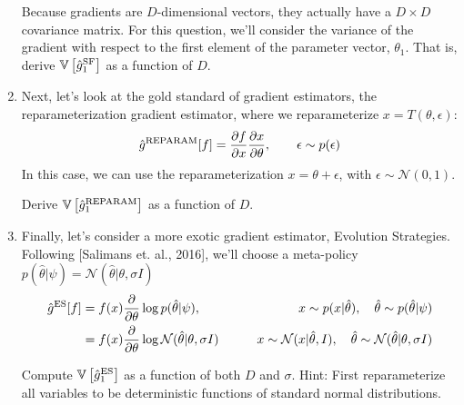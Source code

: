 \documentclass{harvardml}
\newcommand{\distNorm}{\mathcal{N}}
\newcommand{\var}{\mathbb{V}}
\newcommand{\PT}{\frac{\partial}{\partial \theta}}
\theoremstyle{plain}
\begin{document}
\begin{problem}
\begin{enumerate}[label=(\alph*)]
Because gradients are $D$-dimensional vectors, they actually have a $D \times D$ covariance matrix.
For this question, we'll consider the variance of the gradient with respect to the first element of the parameter vector, $\theta_1$.
%
That is, derive $\var \left[ \hat g^\textnormal{SF}_1 \right]$ as a function of $D$.

\item Next, let's look at the gold standard of gradient estimators, the reparameterization gradient estimator, where we reparameterize $x = T(\theta, \epsilon)$:
%
\begin{align}
\hat g^\textnormal{REPARAM}[f] = \frac{\partial f}{\partial x} \frac{\partial x}{\partial \theta}, \qquad \epsilon \sim p(\epsilon)
\end{align}
%
In this case, we can use the reparameterization $x = \theta + \epsilon$, with $\epsilon \sim \distNorm(0, 1)$.

Derive $\var \left[ \hat g^\textnormal{REPARAM}_1 \right]$ as a function of $D$.

\item Finally, let's consider a more exotic gradient estimator, Evolution Strategies.
Following [Salimans et. al., 2016], we'll choose a meta-policy $p(\hat \theta | \psi) = \distNorm(\hat \theta |  \theta, \sigma I)$
%
\begin{align}
\hat g^\textnormal{ES}[f]
& = f(x) \PT \log p(\hat \theta | \psi), 
& \qquad x \sim p(x | \hat \theta),\quad \hat \theta \sim p(\hat \theta | \psi) \\
& = f(x) \PT \log \distNorm(\hat \theta | \theta, \sigma I)
& \qquad x \sim \distNorm(x | \hat \theta, I), \quad \hat \theta \sim \distNorm(\hat \theta | \theta, \sigma I)
\end{align}
%

Compute $\var \left[ \hat g^\textnormal{ES}_1 \right]$ as a function of both $D$ and $\sigma$.  Hint: First reparameterize all variables to be deterministic functions of standard normal distributions.
\end{enumerate}
\end{problem}
\end{document}

